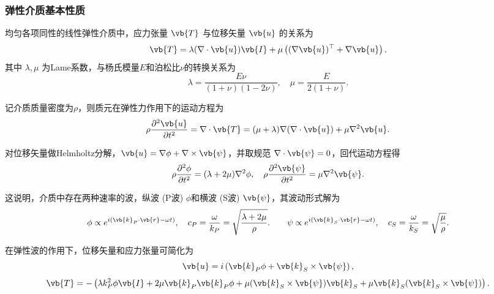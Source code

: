 \subsubsection{弹性介质基本性质}

均匀各项同性的线性弹性介质中，应力张量 \(\vb{T}\) 与位移矢量 \(\vb{u}\) 的关系为
\begin{equation*}
	\vb{T} = \lambda (\nabla \cdot \vb{u}) \vb{I} + \mu \left( (\nabla \vb{u})^\top + \nabla \vb{u} \right).
\end{equation*}
其中 \(\lambda, \mu\) 为Lame系数，与杨氏模量\(E\)和泊松比\(\nu\)的转换关系为
\begin{equation*}
	\lambda = \dfrac{E\nu}{(1 + \nu)(1 - 2\nu)}, \quad \mu = \dfrac{E}{2(1 + \nu)}.
\end{equation*}

记介质质量密度为\(\rho\)，则质元在弹性力作用下的运动方程为
\begin{equation*}
	\rho \dfrac{\partial^2 \vb{u}}{\partial t^2} = \nabla \cdot \vb{T} = (\mu + \lambda) \nabla (\nabla \cdot \vb{u}) + \mu \nabla^2 \vb{u}.
\end{equation*}

对位移矢量做Helmholtz分解，\(\vb{u} = \nabla \phi + \nabla \times \vb{\psi}\)，并取规范 \(\nabla \cdot \vb{\psi} = 0\)，回代运动方程得
\begin{equation*}
	\rho \dfrac{\partial^2 \phi}{\partial t^2} = (\lambda + 2\mu) \nabla^2 \phi, \quad \rho \dfrac{\partial^2 \vb{\psi}}{\partial t^2} = \mu \nabla^2 \vb{\psi}.
\end{equation*}

这说明，介质中存在两种速率的波，纵波 (P波) \(\phi\)和横波 (S波) \(\vb{\psi}\)，其波动形式解为
\begin{equation*}
	\phi \propto e^{i(\vb{k}_P \cdot \vb{r} - \omega t)}, \quad c_P = \dfrac{\omega}{k_P} = \sqrt{\dfrac{\lambda + 2\mu}{\rho}}.\qquad{\psi} \propto e^{i(\vb{k}_S \cdot \vb{r} - \omega t)}, \quad c_S = \dfrac{\omega}{k_S} = \sqrt{\dfrac{\mu}{\rho}}.
\end{equation*}

在弹性波的作用下，位移矢量和应力张量可简化为
\begin{equation*}
	\vb{u} = i \left( \vb{k}_P \phi + \vb{k}_S \times \vb{\psi} \right),
\end{equation*}
\begin{equation*}
	\vb{T} = -\left( \lambda k_P^2 \phi \vb{I} + 2\mu \vb{k}_P \vb{k}_P \phi + \mu (\vb{k}_S \times \vb{\psi}) \vb{k}_S + \mu \vb{k}_S (\vb{k}_S \times \vb{\psi}) \right).
\end{equation*}


